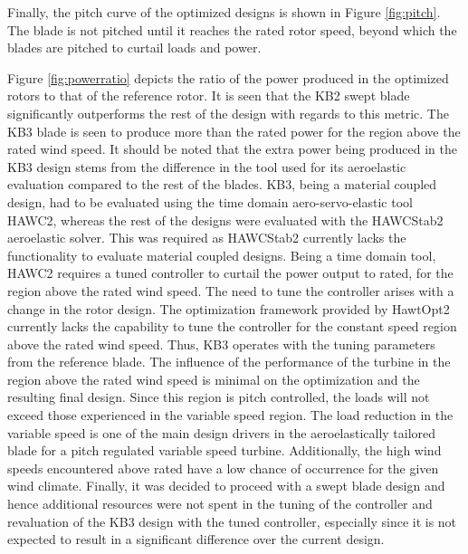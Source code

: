 Finally, the pitch curve of the optimized designs is shown in Figure \ref{fig:pitch}. The blade is not pitched until it reaches the rated rotor speed, beyond which the blades are pitched to curtail loads and power.

Figure \ref{fig:powerratio} depicts the ratio of the power produced in the optimized rotors to that of the reference rotor. It is seen that the KB2 swept blade significantly outperforms the rest of the design with regards to this metric. The KB3 blade is seen to produce more than the rated power for the region above the rated wind speed.  
It should be noted that the extra power being produced in the KB3 design stems from the difference in the tool used for its aeroelastic evaluation compared to the rest of the blades. KB3, being a material coupled design, had to be evaluated using the time domain aero-servo-elastic tool HAWC2, whereas the rest of the designs were evaluated with the HAWCStab2 aeroelastic solver. This was required as HAWCStab2 currently lacks the functionality to evaluate material coupled designs. Being a time domain tool, HAWC2 requires a tuned controller to curtail the power output to rated, for the region above the rated wind speed. The need to tune the controller arises with a change in the rotor design. The optimization framework provided by HawtOpt2 currently lacks the capability to tune the controller for the constant speed region above the rated wind speed. Thus, KB3 operates with the tuning parameters from the reference blade. The influence of the performance of the turbine in the region above the rated wind speed is minimal on the optimization and the resulting final design. Since this region is pitch controlled, the loads will not exceed those experienced in the variable speed region. The load reduction in the variable speed is one of the main design drivers in the aeroelastically tailored blade for a pitch regulated variable speed turbine. Additionally, the high wind speeds encountered above rated have a low chance of occurrence for the given wind climate. Finally, it was decided to proceed with a swept blade design and hence additional resources were not spent in the tuning of the controller and revaluation of the KB3 design with the tuned controller, especially since it is not expected to result in a significant difference over the current design.


